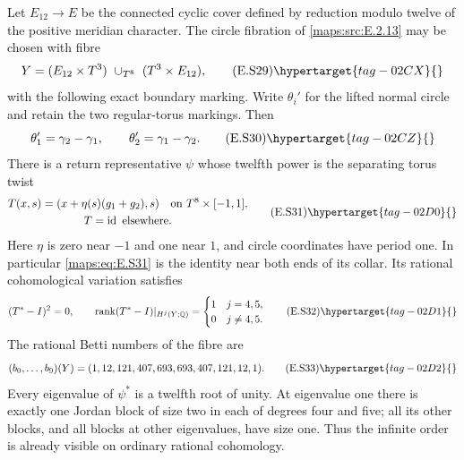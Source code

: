\begin{theorem}\hypertarget{tag-02ME}{}\label{maps:src:E.2.14}


Let $E_{12}\to E$ be the connected cyclic cover defined by
reduction modulo twelve of the positive meridian character.
The circle fibration of \ref{maps:src:E.2.13} may be chosen with fibre
\[
 Y=(E_{12}\times T^3)\ \cup_{T^8}\ (T^3\times E_{12}),
 \tag{E.S29}\hypertarget{tag-02CX}{}\label{maps:eq:E.S29}
\]
with the following exact boundary marking. Write
$\theta_i'$ for the lifted normal circle and retain the
two regular-torus markings. Then
\[
       \theta_1'=\gamma_2-\gamma_1,\qquad
       \theta_2'=\gamma_1-\gamma_2.
 \tag{E.S30}\hypertarget{tag-02CZ}{}\label{maps:eq:E.S30}
\]
There is a return representative $\psi$ whose twelfth power
is the separating torus twist
\[
 \begin{gathered}
 T(x,s)=(x+\eta(s)(g_1+g_2),s)\quad\hbox{on }T^8\times[-1,1],
 \\
 T=\operatorname{id}\text{ elsewhere}.
 \end{gathered}
 \tag{E.S31}\hypertarget{tag-02D0}{}\label{maps:eq:E.S31}
\]
Here $\eta$ is zero near $-1$ and one near $1$, and circle
coordinates have period one. In particular \eqref{maps:eq:E.S31} is the
identity near both ends of its collar. Its rational
cohomological variation satisfies
\[
 (T^*-I)^2=0,\qquad
 \operatorname{rank}(T^*-I)|_{H^j(Y;\mathbb Q)}=
 \begin{cases}1&j=4,5,\\0&j\ne4,5.\end{cases}
 \tag{E.S32}\hypertarget{tag-02D1}{}\label{maps:eq:E.S32}
\]
The rational Betti numbers of the fibre are
\[
       (b_0,\ldots,b_9)(Y)
          =(1,12,121,407,693,693,407,121,12,1).
 \tag{E.S33}\hypertarget{tag-02D2}{}\label{maps:eq:E.S33}
\]
Every eigenvalue of $\psi^*$ is a twelfth root of unity.
At eigenvalue one there is exactly one Jordan block of
size two in each of degrees four and five; all its other
blocks, and all blocks at other eigenvalues, have size one.
Thus the infinite order is already visible on ordinary
rational cohomology. \end{theorem}


